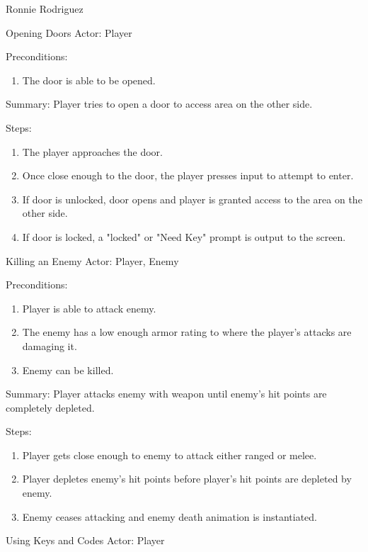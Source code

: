 \documentclass[12pt]{report}
\begin{document}
\begin{section}{Ronnie Rodriguez}
\begin{subsection}{Opening Doors}
Actor: Player

Preconditions:
\begin{enumerate}
\item The door is able to be opened.
\end{enumerate}

Summary: Player tries to open a door to access area on the other side. 

Steps:
\begin{enumerate}
\item The player approaches the door.
\item Once close enough to the door, the player presses input to attempt to
enter.
\item If door is unlocked, door opens and player is granted access to the
area on the other side.
\item If door is locked, a "locked" or "Need Key" prompt is output to the
screen.
\end{enumerate}
\end{subsection}

\begin{subsection}{Killing an Enemy}
Actor: Player, Enemy

Preconditions:
\begin{enumerate}
\item Player is able to attack enemy.
\item The enemy has a low enough armor rating to where the player's attacks
are damaging it.
\item Enemy can be killed.
\end{enumerate}

Summary: Player attacks enemy with weapon until enemy's hit points are
completely depleted.

Steps:
\begin{enumerate}
\item Player gets close enough to enemy to attack either ranged or melee.
\item Player depletes enemy's hit points before player's hit points are
depleted by enemy.
\item Enemy ceases attacking and enemy death animation is instantiated.
\end{enumerate}
\end{subsection}

\begin{subsection}{Using Keys and Codes}
Actor: Player


\end{subsection}
\end{section}
\end{document}
